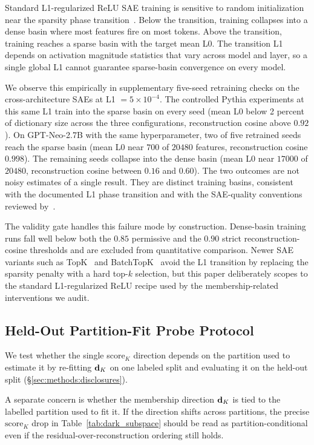 Standard L1-regularized ReLU SAE training is sensitive to random initialization near the sparsity phase transition~\citep{bricken2023monosemanticity}. Below the transition, training collapses into a dense basin where most features fire on most tokens. Above the transition, training reaches a sparse basin with the target mean L0. The transition L1 depends on activation magnitude statistics that vary across model and layer, so a single global L1 cannot guarantee sparse-basin convergence on every model.

We observe this empirically in supplementary five-seed retraining checks on the cross-architecture SAEs at L1 $= 5 \times 10^{-4}$. The controlled Pythia experiments at this same L1 train into the sparse basin on every seed (mean L0 below 2 percent of dictionary size across the three configurations, reconstruction cosine above $0.92$). On GPT-Neo-2.7B with the same hyperparameter, two of five retrained seeds reach the sparse basin (mean L0 near $700$ of $20480$ features, reconstruction cosine $0.998$). The remaining seeds collapse into the dense basin (mean L0 near $17000$ of $20480$, reconstruction cosine between $0.16$ and $0.60$). The two outcomes are not noisy estimates of a single result. They are distinct training basins, consistent with the documented L1 phase transition and with the SAE-quality conventions reviewed by~\citet{karvonen2025saebench}.

The validity gate handles this failure mode by construction. Dense-basin training runs fall well below both the $0.85$ permissive and the $0.90$ strict reconstruction-cosine thresholds and are excluded from quantitative comparison. Newer SAE variants such as TopK~\citep{gao2025scaling} and BatchTopK~\citep{bussmann2024batchtopk} avoid the L1 transition by replacing the sparsity penalty with a hard top-$k$ selection, but this paper deliberately scopes to the standard L1-regularized ReLU recipe used by the membership-related interventions we audit.

\subsection{Held-Out Partition-Fit Probe Protocol}
\label{app:heldout_dk_protocol}

We test whether the single score$_K$ direction depends on the partition used to estimate it by re-fitting $\mathbf{d}_K$ on one labeled split and evaluating it on the held-out split (\S\ref{sec:methods:disclosures}).

A separate concern is whether the membership direction $\mathbf{d}_K$ is tied to the labelled partition used to fit it. If the direction shifts across partitions, the precise $\mathrm{score}_K$ drop in Table~\ref{tab:dark_subspace} should be read as partition-conditional even if the residual-over-reconstruction ordering still holds.

